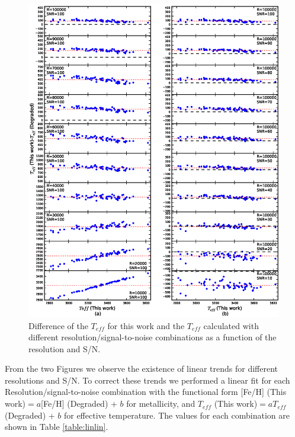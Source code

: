 \documentclass{aa}
\begin{document}
\begin{figure}[h!]
\begin{center}
\includegraphics[scale=0.9]{pics/resnr_teffv2.eps}
\end{center}
\caption{Difference of the $T_{eff}$ for this work and the $T_{eff}$ calculated with different resolution/signal-to-noise combinations as a function of the resolution and S/N.}
\label{fig:resnr-teff}
\end{figure}


From the two Figures we observe the existence of linear trends for different resolutions and S/N. To correct these trends we performed a linear fit for each Resolution/signal-to-noise combination with the functional form [Fe/H] (This work)$ = a$[Fe/H] (Degraded) + $b$ for metallicity, and 
$T_{eff}$ (This work)$ = aT_{eff}$ (Degraded) + $b$ for effective temperature. The values for each combination are shown in Table \ref{table:linlin}.
\end{document}
